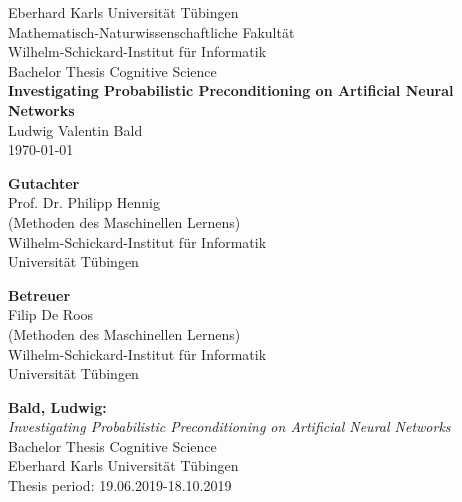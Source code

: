 \documentclass[twoside,12pt,a4paper]{report}
\begin{document}

\begin{titlepage}
	\begin{center}
		{\LARGE Eberhard Karls Universit\"at T\"ubingen}\\
		{\large Mathematisch-Naturwissenschaftliche Fakult\"at \\
			Wilhelm-Schickard-Institut f\"ur Informatik\\[4cm]}
		{\huge Bachelor Thesis Cognitive Science\\[2cm]}
		{\Large\bf  Investigating Probabilistic Preconditioning on Artificial Neural Networks \\[1.5cm]}
		{\large Ludwig Valentin Bald}\\[0.5cm]
		\today \\[4cm]
		\parbox{7cm}{\begin{center}{{\small\bf Gutachter}\\
				[0.5cm]\large Prof. Dr. Philipp Hennig}\\
				(Methoden des Maschinellen Lernens)\\
				{\footnotesize Wilhelm-Schickard-Institut f\"ur Informatik\\
				Universit\"at T\"ubingen}\end{center}}\hfill\parbox{7cm}
				{\begin{center}
				{\small\bf Betreuer}\\[0.5cm]
				{\large Filip De Roos}\\
				(Methoden des Maschinellen Lernens)\\
				{\footnotesize Wilhelm-Schickard-Institut f\"ur Informatik\\
					Universit\"at T\"ubingen}\end{center}
		}
	\end{center}
\end{titlepage}



\thispagestyle{empty}
\vspace*{\fill}
\begin{minipage}{11.2cm}
	\textbf{Bald, Ludwig:}\\
	\emph{Investigating Probabilistic Preconditioning on Artificial Neural Networks}\\ Bachelor Thesis Cognitive Science\\
	Eberhard Karls Universit\"at T\"ubingen\\
	Thesis period: 19.06.2019-18.10.2019
\end{minipage}
\newpage
\end{document}
